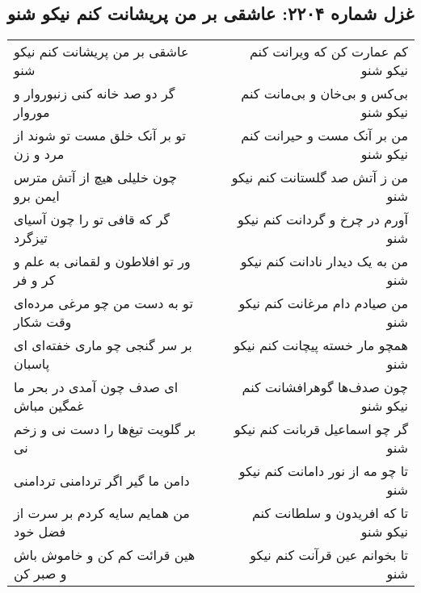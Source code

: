 \begin{center}
\section*{غزل شماره ۲۲۰۴: عاشقی بر من پریشانت کنم نیکو شنو}
\label{sec:2204}
\begin{longtable}{l p{0.5cm} r}
عاشقی بر من پریشانت کنم نیکو شنو
&&
کم عمارت کن که ویرانت کنم نیکو شنو
\\
گر دو صد خانه کنی زنبوروار و موروار
&&
بی‌کس و بی‌خان و بی‌مانت کنم نیکو شنو
\\
تو بر آنک خلق مست تو شوند از مرد و زن
&&
من بر آنک مست و حیرانت کنم نیکو شنو
\\
چون خلیلی هیچ از آتش مترس ایمن برو
&&
من ز آتش صد گلستانت کنم نیکو شنو
\\
گر که قافی تو را چون آسیای تیزگرد
&&
آورم در چرخ و گردانت کنم نیکو شنو
\\
ور تو افلاطون و لقمانی به علم و کر و فر
&&
من به یک دیدار نادانت کنم نیکو شنو
\\
تو به دست من چو مرغی مرده‌ای وقت شکار
&&
من صیادم دام مرغانت کنم نیکو شنو
\\
بر سر گنجی چو ماری خفته‌ای ای پاسبان
&&
همچو مار خسته پیچانت کنم نیکو شنو
\\
ای صدف چون آمدی در بحر ما غمگین مباش
&&
چون صدف‌ها گوهرافشانت کنم نیکو شنو
\\
بر گلویت تیغ‌ها را دست نی و زخم نی
&&
گر چو اسماعیل قربانت کنم نیکو شنو
\\
دامن ما گیر اگر تردامنی تردامنی
&&
تا چو مه از نور دامانت کنم نیکو شنو
\\
من همایم سایه کردم بر سرت از فضل خود
&&
تا که افریدون و سلطانت کنم نیکو شنو
\\
هین قرائت کم کن و خاموش باش و صبر کن
&&
تا بخوانم عین قرآنت کنم نیکو شنو
\\
\end{longtable}
\end{center}

